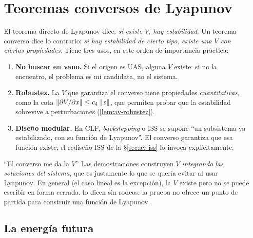 \section{Teoremas conversos de Lyapunov}
\label{sec:av-conversos}

El teorema directo de Lyapunov dice: \emph{si existe $V$, hay estabilidad}. Un teorema converso dice lo contrario: \emph{si hay estabilidad de cierto tipo, existe una $V$ con ciertas propiedades}. Tiene tres usos, en este orden de importancia práctica:
\begin{enumerate}
  \item \textbf{No buscar en vano.} Si el origen es UAS, alguna $V$ existe: si no la encuentro, el problema es mi candidata, no el sistema.
  \item \textbf{Robustez.} La $V$ que garantiza el converso tiene propiedades \emph{cuantitativas}, como la cota $\left\lVert \partial V/\partial x\right\rVert\le c_4\left\lVert x\right\rVert$, que permiten probar que la estabilidad sobrevive a perturbaciones (\cref{lem:av-robustez}).
  \item \textbf{Diseño modular.} En CLF, \emph{backstepping} o ISS se supone ``un subsistema ya estabilizado, con su función de Lyapunov''. El converso garantiza que esa función existe; el rediseño ISS de la \S\ref{sec:av-iss} lo invoca explícitamente.
\end{enumerate}

\begin{trampa}[label=tr:av-converso]{``El converso me da la $V$''}
Las demostraciones construyen $V$ \emph{integrando las soluciones del sistema}, que es justamente lo que se quería evitar al usar Lyapunov. En general (el caso lineal es la excepción), la $V$ existe pero no se puede escribir en forma cerrada. \citet[\S2.5]{KeBr23} lo dicen sin rodeos: la prueba no ofrece un punto de partida para construir una función de Lyapunov.
\end{trampa}

\subsection{La energía futura}

